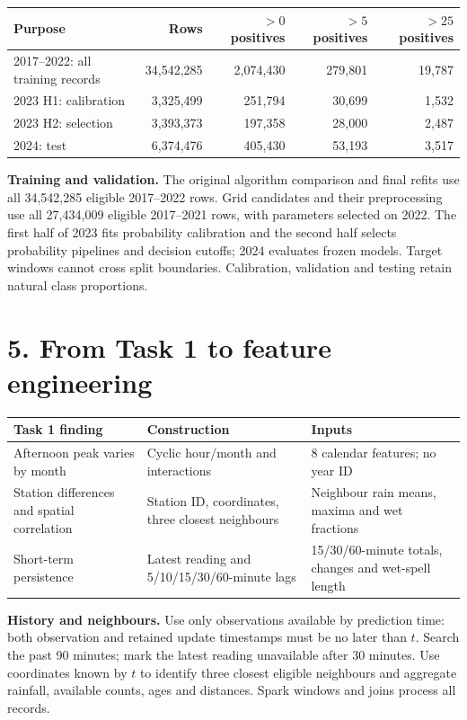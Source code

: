 \documentclass[UTF8,fontset=fandol,10pt,a4paper,landscape]{ctexart}
\begin{document}
\begin{center}\begin{tabular}{lrrrr}\toprule
Purpose & Rows & $>0$ positives & $>5$ positives & $>25$ positives\\\midrule
2017--2022: all training records & 34,542,285 & 2,074,430 & 279,801 & 19,787\\
2023 H1: calibration & 3,325,499 & 251,794 & 30,699 & 1,532\\
2023 H2: selection & 3,393,373 & 197,358 & 28,000 & 2,487\\
2024: test & 6,374,476 & 405,430 & 53,193 & 3,517\\
\bottomrule\end{tabular}\end{center}

\textbf{Training and validation.} The original algorithm comparison and final refits use all 34,542,285 eligible 2017--2022 rows. Grid candidates and their preprocessing use all 27,434,009 eligible 2017--2021 rows, with parameters selected on 2022. The first half of 2023 fits probability calibration and the second half selects probability pipelines and decision cutoffs; 2024 evaluates frozen models. Target windows cannot cross split boundaries. Calibration, validation and testing retain natural class proportions.

\clearpage\section*{5. From Task 1 to feature engineering}
\begingroup\small
\begin{center}\begin{tabular}{p{5.2cm}p{9.0cm}p{9.0cm}}\toprule
Task 1 finding & Construction & Inputs\\\midrule
Afternoon peak varies by month & Cyclic hour/month and interactions & 8 calendar features; no year ID\\
Station differences and spatial correlation & Station ID, coordinates, three closest neighbours & Neighbour rain means, maxima and wet fractions\\
Short-term persistence & Latest reading and 5/10/15/30/60-minute lags & 15/30/60-minute totals, changes and wet-spell length\\
\bottomrule\end{tabular}\end{center}

\textbf{History and neighbours.} Use only observations available by prediction time: both observation and retained update timestamps must be no later than $t$. Search the past 90 minutes; mark the latest reading unavailable after 30 minutes. Use coordinates known by $t$ to identify three closest eligible neighbours and aggregate rainfall, available counts, ages and distances. Spark windows and joins process all records.
\end{document}
